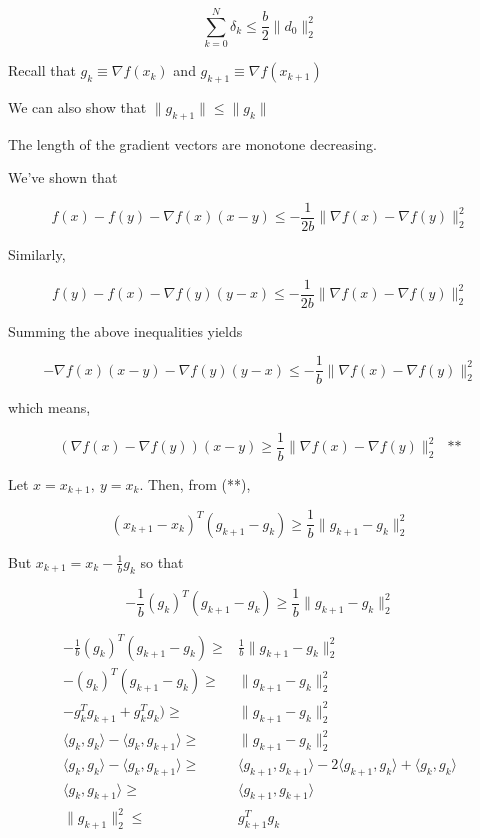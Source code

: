 \documentclass[11pt]{article}
\begin{document}
$$
\sum_{k = 0}^{N} \delta_k \leq \frac{b}{2} \|d_0\|_2^2
$$

Recall that \(g_k \equiv \nabla f(x_k)\) and \(g_{k + 1} \equiv \nabla f(x_{k + 1})\)

We can also show that \(\|g_{k + 1}\| \leq \|g_k\|\)

The length of the gradient vectors are monotone decreasing.

We've shown that

$$
f(x) - f(y) - \nabla f(x) (x - y) \leq - \frac{1}{2b} \|\nabla f(x) - \nabla f(y)\|_2^2
$$

Similarly,


$$
f(y) - f(x) - \nabla f(y) (y - x) \leq - \frac{1}{2b} \|\nabla f(x) - \nabla f(y)\|_2^2
$$

Summing the above inequalities yields

$$-\nabla f(x) (x - y) - \nabla f(y) (y - x) \leq - \frac{1}{b} \|\nabla f(x) -
\nabla f(y)\|_2^2$$

which means,

$$
(\nabla f(x) - \nabla f(y)) (x - y) \geq \frac{1}{b} \|\nabla f(x) - \nabla
f(y)\|_2^2 \ \ \ \text{**}
$$

Let \(x = x_{k + 1}, \ y = x_k\). Then, from (**),

$$
(x_{k + 1} - x_k)^T (g_{k + 1} - g_k) \geq \frac{1}{b} \|g_{k + 1} - g_k\|_2^2
$$

But \(x_{k + 1} = x_k - \frac{1}{b} g_k\) so that

$$
-\frac{1}{b} (g_k)^T (g_{k + 1} - g_k) \geq \frac{1}{b} \|g_{k + 1} - g_k\|_2^2
$$

\begin{subequations}
\label{first:mythird}
\begin{align}
-\frac{1}{b} (g_k)^T (g_{k + 1} - g_k) \geq & \frac{1}{b} \|g_{k + 1} - g_k\|_2^2\\
- (g_k)^T (g_{k + 1} - g_k) \geq & \|g_{k + 1} - g_k\|_2^2\\
- g_k^T g_{k + 1} + g_k^T g_k) \geq & \|g_{k + 1} - g_k\|_2^2\\
\langle g_k, g_k \rangle - \langle g_k, g_{k+1} \rangle \geq & \|g_{k + 1} - g_k\|_2^2\\
\langle g_k, g_k \rangle - \langle g_k, g_{k+1} \rangle \geq & \langle g_{k + 1}, g_{k + 1} \rangle - 2 \langle g_{k + 1}, g_k \rangle + \langle g_k, g_k \rangle\\
\langle g_k, g_{k+1} \rangle \geq & \langle g_{k + 1}, g_{k + 1} \rangle\\
\|g_{k+1}\|_2^2 \leq & g_{k+1}^T g_k
\end{align}
\end{subequations}
\end{document}
